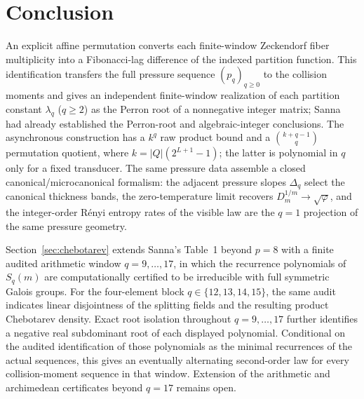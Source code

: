 \section{Conclusion}\label{sec:conclusion}

An explicit affine permutation converts each finite-window Zeckendorf fiber
multiplicity into a Fibonacci-lag difference of the indexed partition function.
This identification transfers the full pressure sequence $(p_q)_{q\ge 0}$ to
the collision moments and gives an independent finite-window realization of
each partition constant $\lambda_q$ ($q\ge 2$) as the Perron root of a
nonnegative integer matrix; Sanna had already established the Perron-root and
algebraic-integer conclusions.  The
asynchronous construction has a $k^q$ raw product bound and a
$\binom{k+q-1}{q}$ permutation quotient, where
$k=|Q|(2^{L+1}-1)$; the latter is polynomial in $q$ only for a fixed
transducer.  The same pressure data assemble a closed canonical/microcanonical
formalism: the adjacent pressure
slopes $\Delta_q$ select the canonical thickness bands, the zero-temperature
limit recovers $D_m^{1/m}\to\sqrt{\varphi}$, and the integer-order R\'enyi
entropy rates of the visible law are the $q=1$ projection of the same pressure
geometry.

Section~\ref{sec:chebotarev} extends Sanna's Table~1 beyond $p=8$ with a
finite audited arithmetic window $q=9,\dots,17$, in which the recurrence
polynomials of $S_q(m)$ are computationally certified to be irreducible with
full symmetric Galois groups.
For the four-element block $q\in\{12,13,14,15\}$, the same audit indicates
linear disjointness of the splitting fields and the resulting product
Chebotarev density.  Exact root isolation throughout $q=9,\dots,17$ further
identifies a negative real subdominant root of each displayed polynomial.
Conditional on the audited identification of those polynomials as the minimal
recurrences of the actual sequences, this gives an eventually alternating
second-order law for every collision-moment sequence in that window.
Extension of the arithmetic and archimedean certificates beyond
$q=17$ remains open.

